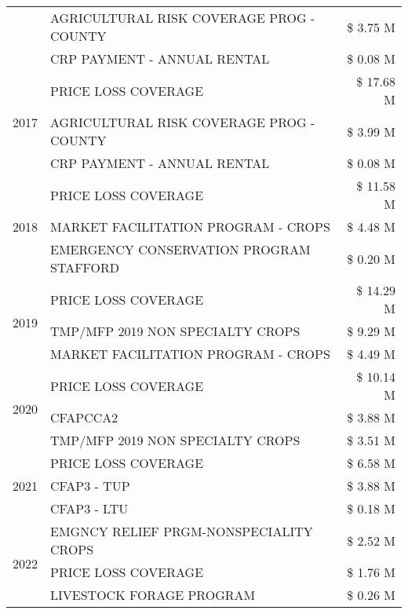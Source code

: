 \begin{tabular}{llr}
 & AGRICULTURAL RISK COVERAGE PROG - COUNTY & \$ 3.75 M \\
 & CRP PAYMENT - ANNUAL RENTAL & \$ 0.08 M \\
\cline{1-3}
\multirow[t]{3}{*}{2017} & PRICE LOSS COVERAGE & \$ 17.68 M \\
 & AGRICULTURAL RISK COVERAGE PROG - COUNTY & \$ 3.99 M \\
 & CRP PAYMENT - ANNUAL RENTAL & \$ 0.08 M \\
\cline{1-3}
\multirow[t]{3}{*}{2018} & PRICE LOSS COVERAGE & \$ 11.58 M \\
 & MARKET FACILITATION PROGRAM - CROPS & \$ 4.48 M \\
 & EMERGENCY CONSERVATION PROGRAM STAFFORD & \$ 0.20 M \\
\cline{1-3}
\multirow[t]{3}{*}{2019} & PRICE LOSS COVERAGE & \$ 14.29 M \\
 & TMP/MFP 2019 NON SPECIALTY CROPS & \$ 9.29 M \\
 & MARKET FACILITATION PROGRAM - CROPS & \$ 4.49 M \\
\cline{1-3}
\multirow[t]{3}{*}{2020} & PRICE LOSS COVERAGE & \$ 10.14 M \\
 & CFAPCCA2 & \$ 3.88 M \\
 & TMP/MFP 2019 NON SPECIALTY CROPS & \$ 3.51 M \\
\cline{1-3}
\multirow[t]{3}{*}{2021} & PRICE LOSS COVERAGE & \$ 6.58 M \\
 & CFAP3 - TUP & \$ 3.88 M \\
 & CFAP3 - LTU & \$ 0.18 M \\
\cline{1-3}
\multirow[t]{3}{*}{2022} & EMGNCY RELIEF PRGM-NONSPECIALITY CROPS & \$ 2.52 M \\
 & PRICE LOSS COVERAGE & \$ 1.76 M \\
 & LIVESTOCK FORAGE PROGRAM & \$ 0.26 M \\
\cline{1-3}
\bottomrule
\end{tabular}
